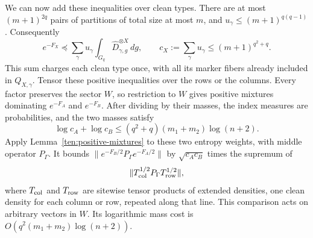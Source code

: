 We can now add these inequalities over clean types. There are at most
$(m+1)^{2q}$ pairs of partitions of total size at most $m$, and
$u_\gamma\le(m+1)^{q(q-1)}$. Consequently
\[
 e^{-F_X}\preceq
 \sum_\gamma u_\gamma\int_{G_q}\widehat D_{\gamma,g}^{\otimes X}\,dg,
 \qquad
 c_X:=\sum_\gamma u_\gamma\le(m+1)^{q^2+q}.
\]
This sum charges each clean type once, with all its marker fibers
already included in $Q_{X,\gamma}$. Tensor these positive inequalities
over the rows or the columns. Every factor preserves the sector $W$,
so restriction to $W$ gives positive mixtures dominating $e^{-F_A}$
and $e^{-F_B}$. After dividing by their masses, the index measures
are probabilities, and the two masses satisfy
\[
 \log c_A+\log c_B
 \le (q^2+q)(m_1+m_2)\log(n+2).
\]
Apply Lemma~\ref{ten:positive-mixtures} to these two entropy weights,
with middle operator $P_\Gamma$. It bounds
$\|e^{-F_B/2}P_\Gamma e^{-F_A/2}\|$ by
$\sqrt{c_Ac_B}$ times the supremum of
\[
 \|T_{\rm col}^{1/2}P_\Gamma T_{\rm row}^{1/2}\|,
\]
where $T_{\rm col}$ and $T_{\rm row}$ are sitewise tensor products
of extended densities, one clean density for each column or row,
repeated along that line. This comparison acts on arbitrary vectors
in $W$. Its logarithmic mass cost is
$O(q^2(m_1+m_2)\log(n+2))$.

